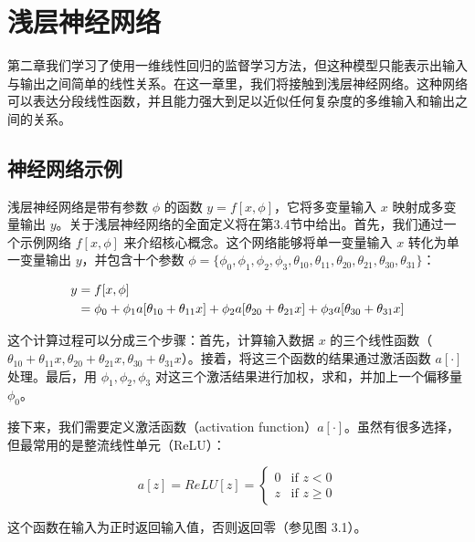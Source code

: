 \chapter{浅层神经网络}

第二章我们学习了使用一维线性回归的监督学习方法，但这种模型只能表示出输入与输出之间简单的线性关系。在这一章里，我们将接触到浅层神经网络。这种网络可以表达分段线性函数，并且能力强大到足以近似任何复杂度的多维输入和输出之间的关系。
\section{神经网络示例}
浅层神经网络是带有参数 \(\phi\) 的函数 \(y = f[x, \phi]\)，它将多变量输入 \(x\) 映射成多变量输出 \(y\)。关于浅层神经网络的全面定义将在第3.4节中给出。首先，我们通过一个示例网络 \(f[x, \phi]\) 来介绍核心概念。这个网络能够将单一变量输入 \(x\) 转化为单一变量输出 \(y\)，并包含十个参数 \(\phi = \{\phi_0, \phi_1, \phi_2, \phi_3, \theta_{10}, \theta_{11}, \theta_{20}, \theta_{21}, \theta_{30}, \theta_{31}\}\)：


\begin{align}
	y &= f[x, \phi] \notag \\ 
	&= \phi_0 + \phi_1a[\theta_{10} + \theta_{11}x] + \phi_2a[\theta_{20} + \theta_{21}x] + \phi_3a[\theta_{30} + \theta_{31}x] 
\end{align}


这个计算过程可以分成三个步骤：首先，计算输入数据 \(x\) 的三个线性函数（\(\theta_{10} + \theta_{11}x, \theta_{20} + \theta_{21}x, \theta_{30} + \theta_{31}x\)）。接着，将这三个函数的结果通过激活函数 \(a[\cdot]\) 处理。最后，用 \(\phi_1, \phi_2, \phi_3\) 对这三个激活结果进行加权，求和，并加上一个偏移量 \(\phi_0\)。

接下来，我们需要定义激活函数（activation function）\(a[\cdot]\)。虽然有很多选择，但最常用的是整流线性单元（ReLU）：

\begin{equation}
a[z] = ReLU[z] = 
\begin{cases}
	0 & \text{if } z < 0 \\
	z & \text{if } z \geq 0
\end{cases} 
\end{equation}

这个函数在输入为正时返回输入值，否则返回零（参见图 3.1）。


